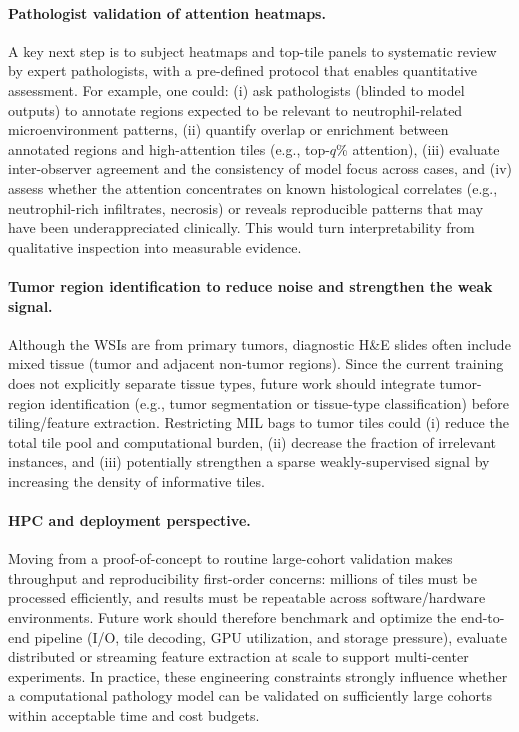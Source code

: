 \paragraph{Pathologist validation of attention heatmaps.}
A key next step is to subject heatmaps and top-tile panels to systematic review by expert pathologists, with a pre-defined protocol that enables quantitative assessment. For example, one could:
(i) ask pathologists (blinded to model outputs) to annotate regions expected to be relevant to neutrophil-related microenvironment patterns,
(ii) quantify overlap or enrichment between annotated regions and high-attention tiles (e.g., top-$q$\% attention),
(iii) evaluate inter-observer agreement and the consistency of model focus across cases,
and (iv) assess whether the attention concentrates on known histological correlates (e.g., neutrophil-rich infiltrates, necrosis) or reveals reproducible patterns that may have been underappreciated clinically.
This would turn interpretability from qualitative inspection into measurable evidence.

\paragraph{Tumor region identification to reduce noise and strengthen the weak signal.}
Although the WSIs are from primary tumors, diagnostic H\&E slides often include mixed tissue (tumor and adjacent non-tumor regions). Since the current training does not explicitly separate tissue types, future work should integrate tumor-region identification (e.g., tumor segmentation or tissue-type classification) before tiling/feature extraction. Restricting MIL bags to tumor tiles could (i) reduce the total tile pool and computational burden, (ii) decrease the fraction of irrelevant instances, and (iii) potentially strengthen a sparse weakly-supervised signal by increasing the density of informative tiles.

\paragraph{HPC and deployment perspective.}
Moving from a proof-of-concept to routine large-cohort validation makes throughput and reproducibility first-order concerns: millions of tiles must be processed efficiently, and results must be repeatable across software/hardware environments. Future work should therefore benchmark and optimize the end-to-end pipeline (I/O, tile decoding, GPU utilization, and storage pressure), evaluate distributed or streaming feature extraction at scale to support multi-center experiments. In practice, these engineering constraints strongly influence whether a computational pathology model can be validated on sufficiently large cohorts within acceptable time and cost budgets.

